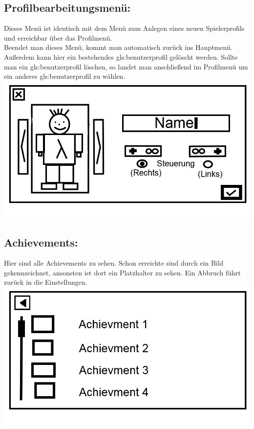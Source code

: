 \documentclass{scrartcl}
\begin{document}
\begin{enumerate}
	\begin{minipage}{1\textwidth}
		\item \subsection*{Profilbearbeitungsmenü:}
		Dieses Menü ist identisch mit dem Menü zum Anlegen eines neuen Spielerprofils und erreichbar über das Profilmenü.\\
		Beendet man dieses Menü, kommt man automatisch zurück ins Hauptmenü.\\
		Außerdem kann hier ein bestehendes \gls{gls:benutzerprofil} gelöscht werden. Sollte man ein \gls{gls:benutzerprofil} löschen, so landet man anschließend im Profilmenü um ein anderes \gls{gls:benutzerprofil} zu wählen.
		\includegraphics[scale=0.5]{assets/CreateProfile2}
	\end{minipage}

	\begin{minipage}{1\textwidth}
		\item \subsection*{Achievements:}
		Hier sind alle Achievements zu sehen. Schon erreichte sind durch ein Bild gekennzeichnet, ansonsten ist dort ein Platzhalter zu sehen. Ein Abbruch führt zurück in die Einstellungen.\\
		\includegraphics[scale=0.5]{assets/Achievments}
		

\end{minipage}
\end{enumerate}
\end{document}
